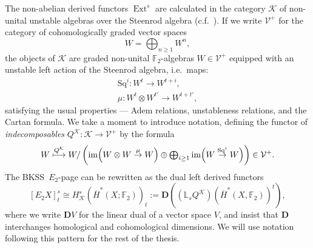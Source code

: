 \documentclass[11pt]{amsart} \renewcommand{\baselinestretch}{1.2}
\theoremstyle{plain}
\numberwithin{equation}{section} %
\theoremstyle{plain}
\numberwithin{equation}{chapter} %
\DeclareMathOperator{\Ext}{Ext}
\DeclareMathOperator{\im}{im}
\renewcommand{\to}{\longrightarrow}
\newcommand{\calV}{\mathcal{V}}
\newcommand{\cala}{\mathcal{A}}
\newcommand{\calk}{\mathcal{K}}
\newcommand{\calc}{\mathcal{C}}
\newcommand{\citeBOX}[2][]{\cite[\mbox{#1}]{#2}}
\newcommand{\vect}[2]{\calV^{#1}_{#2}}
\newcommand{\Sq}{\mathrm{Sq}}
\newcommand{\F}{\mathbb{F}}
\newcommand{\Ftwo}{\F_2}
\newcommand{\E}[5]{[E^{#1}_{#2}#3]^{#4}_{#5}}
\newcommand{\dual}{\mathbf{D}}
\renewcommand{\mapsto}{\longmapsto}
\newcommand{\BKSS}{BKSS}
\begin{document}
\begin{Introduction}
The non-abelian derived functors $\Ext^s$ are calculated in the category 
%
$\calk$ of non-unital unstable algebras over the Steenrod algebra  (c.f.\  \citeBOX[\S1.4]{MR1282727}). If we write $\vect{+}{}$ for the category of cohomologically graded vector spaces \[W=\textstyle \bigoplus_{n\geq 1} W^n,\] the objects of $\calk$ are graded non-unital $\Ftwo$-algebras
$W\in\vect{+}{}$
equipped with an unstable left action of the Steenrod algebra, i.e.\ maps:
\begin{gather*}
\Sq^i: W^t\to W^{t+i},\\
\mu: W^t\otimes W^{t'}\to W^{t+t'},
\end{gather*}
satisfying the usual properties --- Adem relations, unstableness relations, and the Cartan formula.
We take a moment to introduce notation, defining the functor of \emph{indecomposables}
$Q^{\calk}:\calk\to \vect{+}{}$
by the formula
\[W\overset{Q^{\calk}}{\mapsto}W/\left(\im\Bigl(W\otimes W\overset{\mu}{\rightarrow} W\Bigr)\oplus\textstyle\bigoplus_{i\geq1}\im\Bigl(W\overset{\Sq^i}{\rightarrow} W\Bigr)\right)\in\vect{+}{}.\]
The \BKSS\ $E_2$-page can be  rewritten as the dual left derived functors
\[\E{}{2}{X}{s}{t}\cong H^s_{\calk}(\overline{H}^*(X;\Ftwo))_t:=\dual((\mathbb{L}_sQ^{\calk})(\overline{H}^*(X,\Ftwo) )^t),\]
where we write  $\dual V$ for the linear dual of a vector space $V$, and insist that $\dual$ interchanges homological and cohomological dimensions. We will use notation following this pattern for the rest of the thesis.




\end{Introduction}
\end{document}
